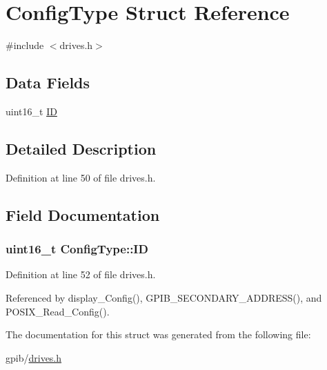\hypertarget{structConfigType}{}\section{Config\+Type Struct Reference}
\label{structConfigType}


{\ttfamily \#include $<$drives.\+h$>$}

\subsection*{Data Fields}
\begin{DoxyCompactItemize}
\item 
uint16\+\_\+t \hyperlink{structConfigType_a7d89346361dc0f06db0917c7ff37501a}{ID}
\end{DoxyCompactItemize}


\subsection{Detailed Description}


Definition at line 50 of file drives.\+h.



\subsection{Field Documentation}
\subsubsection[{\texorpdfstring{ID}{ID}}]{\setlength{\rightskip}{0pt plus 5cm}uint16\+\_\+t Config\+Type\+::\+ID}\hypertarget{structConfigType_a7d89346361dc0f06db0917c7ff37501a}{}\label{structConfigType_a7d89346361dc0f06db0917c7ff37501a}


Definition at line 52 of file drives.\+h.



Referenced by display\+\_\+\+Config(), G\+P\+I\+B\+\_\+\+S\+E\+C\+O\+N\+D\+A\+R\+Y\+\_\+\+A\+D\+D\+R\+E\+S\+S(), and P\+O\+S\+I\+X\+\_\+\+Read\+\_\+\+Config().



The documentation for this struct was generated from the following file\+:\begin{DoxyCompactItemize}
\item 
gpib/\hyperlink{drives_8h}{drives.\+h}\end{DoxyCompactItemize}
